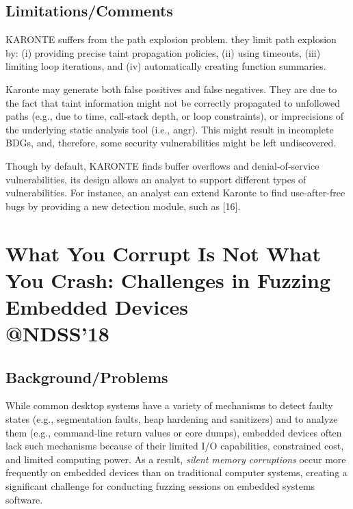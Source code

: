 \subsection{Limitations/Comments}
KARONTE suffers from the path explosion problem. 
they limit path explosion by: (i) providing precise taint propagation policies, (ii) using timeouts, (iii) limiting loop iterations, and (iv) automatically creating function summaries.

Karonte may generate both false positives and false negatives. They are due to the fact that taint information might not be correctly propagated to unfollowed paths (e.g., due to time, call-stack depth, or loop constraints), or imprecisions of the underlying static analysis tool (i.e., angr). This might result in incomplete BDGs, and, therefore, some security vulnerabilities might be left undiscovered. 

Though by default, KARONTE finds buffer overflows and denial-of-service vulnerabilities, its design allows an analyst to support different types of vulnerabilities. For instance, an analyst can extend Karonte to find use-after-free bugs by providing a new detection module, such as [16].
\newpage
\section{What You Corrupt Is Not What You Crash: Challenges in Fuzzing Embedded Devices \\@NDSS'18}
\subsection{Background/Problems}
While common desktop systems have a variety of mechanisms to detect faulty states (e.g., segmentation faults, heap hardening and sanitizers) and to analyze them (e.g., command-line return values or core dumps), embedded devices often lack such mechanisms because of their limited I/O capabilities, constrained cost, and limited computing power.  As a result, \emph{silent memory corruptions} occur more frequently on embedded devices than on traditional computer systems, creating a significant challenge for conducting fuzzing sessions on embedded systems software.
